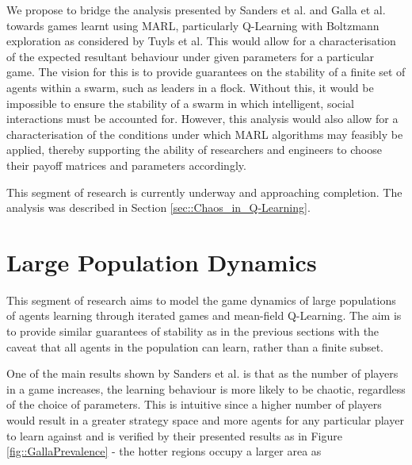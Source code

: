 \documentclass[.../main.tex]{subfiles}
\begin{document}
    We propose to bridge the analysis presented by Sanders
    et al. and Galla et al. towards games learnt using MARL, particularly Q-Learning with
    Boltzmann exploration as considered by Tuyls et al. This would allow for a characterisation of
    the expected resultant behaviour under given parameters for a particular game. The vision for
    this is to provide guarantees on the stability of a finite set of agents within a swarm, such as
    leaders in a flock. Without this, it would be impossible to ensure the stability of a swarm in
    which intelligent, social interactions must be accounted for. However, this analysis
    would also allow for a characterisation of the conditions under which MARL algorithms may
    feasibly be applied, thereby supporting the ability of researchers and engineers to choose their
    payoff matrices and parameters accordingly.

    This segment of research is currently underway and approaching completion. The analysis was
    described in Section \ref{sec::Chaos_in_Q-Learning}.


    \section{Large Population Dynamics} \label{sec::Large_Agent_Dynamics}

    This segment of research aims to model the game dynamics of large
    populations of agents learning through iterated games and
    mean-field Q-Learning. The aim is to provide similar guarantees of
    stability as in the previous sections with the caveat that all
    agents in the population can learn, rather than a finite subset.

    One of the main results shown by Sanders et al. \cite{Sanders2018}
    is that as the number of players in a game increases, the learning
    behaviour is more likely to be chaotic, regardless of the choice
    of parameters. This is intuitive since a higher number of players
    would result in a greater strategy space and more agents for any
    particular player to learn against and is verified by their
    presented results as in Figure \ref{fig::GallaPrevalence} - the
    hotter regions occupy a larger area as 
\end{document}
